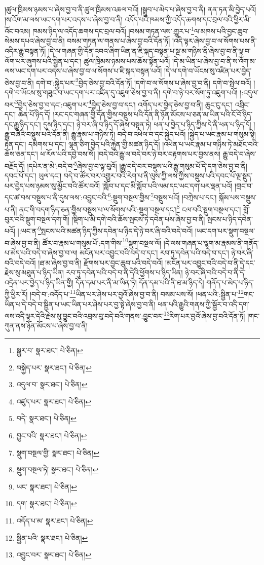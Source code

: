 །ཚུལ་ཁྲིམས་ཉམས་པ་ཞེས་བྱ་བ་ནི་ཚུལ་ཁྲིམས་འཆལ་བའོ། །སྒྲུབ་པ་མེད་པ་ཞེས་བྱ་བ་ནི། ནན་ཏན་མི་བྱེད་པའོ། །ས་འོག་མ་ལས་ཡང་དག་པར་འདས་པ་ཞེས་བྱ་བ་ནི། འདོད་པའི་ཁམས་ཀྱི་འདོད་ཆགས་དང་བྲལ་བའི་ཕྱིར་མི་འོང་བའམ། ཁམས་ཉིད་ལ་འདོད་ཆགས་དང་བྲལ་བའོ། །བསམ་གཏན་ལས་:གྱུར་པ་\footnote{སྒྱུར་བ་  སྣར་ཐང་།  པེ་ཅིན། }ལ་མཁས་པའི་བྱང་ཆུབ་སེམས་དཔའ་ཞེས་བྱ་བ་ནི། བསམ་གཏན་ལ་གནས་པ་ཞེས་བྱ་བའི་དོན་ཏོ། །འདི་ལྟར་ཞེས་བྱ་བ་ལ་སོགས་པས་ནི་འདིར་རྒྱུ་བསྟན་ཏོ། །དེ་ལ་གཞན་གྱི་དོན་འབའ་ཞིག་ཡིན་ན་ཇི་སྐད་བསྟན་པ་སྔ་མ་གཉིས་ནི་ཞེས་བྱ་བ་ནི་ལྟ་བ་ལོག་པར་ཞུགས་པའི་སྦྱིན་པ་དང་། ཚུལ་ཁྲིམས་ཉམས་པས་ཆོས་སྟོན་པའོ། །དེ་མ་ཡིན་པ་ཞེས་བྱ་བ་ནི་ས་འོག་མ་ལས་ཡང་དག་པར་འདས་པ་ཞེས་བྱ་བ་ལ་སོགས་པ་ཇི་སྐད་བསྟན་པའོ། །དེ་ལ་དགེ་བ་ཡོངས་སུ་འཛིན་པར་བྱེད་ཅེས་བྱ་བ་ནི། དགེ་བ་:སྐྱེད་པར་\footnote{བསྐྱེད་པར་  སྣར་ཐང་།  པེ་ཅིན། }བྱེད་ཅེས་བྱ་བའི་དོན་ཏོ། །དགེ་བ་ལ་སོགས་པ་ཞེས་བྱ་བ་ནི། དགེ་བ་སྤེལ་བའོ། །དགེ་བ་ཡོངས་སུ་གཟུང་བ་ཡང་དག་པར་འཛིན་དུ་འཇུག་ཅེས་བྱ་བ་ནི། དགེ་བ་ཉེ་བར་སོག་ཏུ་འཇུག་པའོ། །:འདུལ་བར་\footnote{འདུལ་བ་  སྣར་ཐང་།  པེ་ཅིན། }བྱེད་ཅེས་བྱ་བ་དང་:འཇུག་པར་\footnote{འཛུད་པར་  སྣར་ཐང་།  པེ་ཅིན། }བྱེད་ཅེས་བྱ་བ་དང་། འགོད་པར་བྱེད་ཅེས་བྱ་བ་ནི། ཆུང་ངུ་དང་། འབྲིང་དང་། ཆེན་པོ་ཉིད་དོ། །རང་དང་གཞན་གྱི་དོན་གྱིས་བསྡུས་པའི་དོན་ནི་ཉོན་མོངས་པ་ཅན་མ་ཡིན་པའི་ངོ་བོ་ཉིད་དང་རྒྱུ་ཉིད་དང་། དུས་ཉིད་དང་། ཉེ་བར་ཞི་བ་ཉིད་དོ་ཞེས་བསྟན་ཏེ། ཕན་པ་བྱེད་པ་ཉིད་ཀྱིས་དེ་ནི་ཕན་པ་ཉིད་དོ། །རྒྱུ་བཞིའི་བསྡུས་པའི་དོན་ནི། རྒྱུ་རྣམ་པ་གཉིས་ཏེ། བདེ་བ་འཕེལ་བ་དང་སྐྱེད་པའོ། །སྐྱེད་པ་ཡང་རྣམ་པ་གསུམ་སྟེ། རྟེན་དང་། དམིགས་པ་དང་། ལྷན་ཅིག་བྱེད་པའི་རྐྱེན་གྱི་མཚན་ཉིད་དོ། །འཕེན་པ་ཡང་རྣམ་པ་གཉིས་ཏེ་མཐོང་བའི་ཆོས་ཅན་དང་། ཕ་རོལ་པའི་དབྱེ་བས་སོ། །བདེ་བའི་རྒྱུ་ལ་བདེ་བར་ཉེ་བར་བརྟགས་པར་བྱས་ནས། རྒྱུ་བདེ་བ་ཞེས་བརྗོད་དོ། །དཔེར་ན་མེ་:བདེ་བ་\footnote{བདེ་  སྣར་ཐང་།  པེ་ཅིན། }ཞེས་བྱ་བ་ལྟ་བུའོ། །རྒྱུ་བདེ་བར་བསྡུས་པའི་རྒྱུ་གསུམ་པོ་དེ་དག་ཅེས་བྱ་བ་ནི། དབང་པོ་དང་། ཡུལ་དང་། བདེ་བ་ཚོར་བར་འགྱུར་བའི་རེག་པ་ནི་ལུས་ཀྱི་ལས་ཀྱིས་བསྡུས་པའི་དབང་པོ་ལྔ་སྡུད་པར་བྱེད་པས་ཉམས་སུ་མྱོང་བའི་ཚོར་བའོ། །སློབ་པ་དང་མི་སློབ་པའི་ལམ་དང་ཡང་དག་པར་ལྡན་པའོ། །གྲང་བ་དང་ཚ་བས་བསྡུས་པ་ནི་དུས་ལས་:འབྱུང་བའི་\footnote{བྱུང་བའི་  སྣར་ཐང་།  པེ་ཅིན། }:སྡུག་བསྔལ་གྱིས་\footnote{སྡུག་བསྔལ་གྱི་  སྣར་ཐང་།  པེ་ཅིན། }བསྡུས་པའོ། །བཀྲེས་པ་དང་། སྐོམ་པས་བསྡུས་པ་ནི། ནང་གི་བདག་ཉིད་ཅན་གྱིས་བསྡུས་པ་ལ་སོགས་པའི་:སྡུག་བསྔལ་དང་།\footnote{སྡུག་བསྔལ་ཏེ།  སྣར་ཐང་།  པེ་ཅིན། } ངལ་བའི་སྡུག་བསྔལ་དང་། གློ་བུར་བའི་སྡུག་བསྔལ་དག་གོ། །སྡིག་པ་མི་དགེ་བའི་ཆོས་སྤངས་ཏེ་དབེན་པས་ཞེས་བྱ་བ་ནི། སྤངས་པ་ཉིད་དབེན་པའོ། །:ཡང་ན་\footnote{ཡང་  སྣར་ཐང་།  པེ་ཅིན། }སྤངས་པའི་མཚན་ཉིད་ཀྱིས་དབེན་པ་ཉིད་དེ་ཉེ་བར་ཞི་བའི་བདེ་བའོ། །ཡང་དག་པར་སྡུག་བསྔལ་བ་ཞེས་བྱ་བ་ནི། ཚོར་བ་རྣམ་པ་གསུམ་པོ་:དག་གིས་\footnote{དག་  སྣར་ཐང་།  པེ་ཅིན། }སྡུག་བསྔལ་ལོ། །དེ་ལས་གཞན་པ་ལྷག་མ་རྣམས་ནི་གནོད་པ་མེད་པའི་བདེ་བ་ཞེས་བྱ་བ་ལ། མངོན་པར་འབྱུང་བའི་བདེ་བ་དང་། རབ་ཏུ་དབེན་པའི་བདེ་བ་དང་། ཉེ་བར་ཞི་བའི་བདེ་བའོ། །ཐ་མ་ཞེས་བྱ་བ་ནི། རྫོགས་པར་བྱང་ཆུབ་པའི་བདེ་བའོ། །མངོན་པར་འབྱུང་བའི་བདེ་བ་ནི་དེ་དང་རྗེས་སུ་མཐུན་པ་ཉིད་ཡིན། རབ་ཏུ་དབེན་པའི་བདེ་བ་ནི་དེའི་ཕྱོགས་པ་ཉིད་ཡིན། ཉེ་བར་ཞི་བའི་བདེ་བ་ནི་དེ་འདྲེན་པར་བྱེད་པ་ཉིད་ཡིན་གྱི། དོན་དམ་པར་ནི་མ་ཡིན་ཏེ། དོན་དམ་པའི་ནི་ཐ་མ་ཉིད་དེ། གནོད་པ་མེད་པ་ཉིད་ཀྱི་ཕྱིར་རོ། །བདེ་བ་:འདོད་པ་\footnote{འདོད་པ་མ་  སྣར་ཐང་།  པེ་ཅིན། }ཡིན་པར་ཤེས་པར་བྱའོ་ཞེས་བྱ་བ་ནི། བསམ་པས་སོ། །ཕན་པའི་:སྦྱིན་པ་\footnote{སྦྱིན་པའི་  སྣར་ཐང་།  པེ་ཅིན། }གང་ཡིན་པ་དེ་བདེ་བ་སྦྱིན་པ་ཡང་ཡིན་པར་ཤེས་པར་བྱ་སྟེ་ཞེས་བྱ་བ་ནི། ཕན་པའི་རྒྱུའི་གནས་ཀྱི་སྦྱོར་བ་འདི་དག་ལས་འདི་ལྟར་དེའི་རྗེས་སུ་བྱུང་བའི་འབྲས་བུ་བདེ་བའི་གནས་:བྱུང་བར་\footnote{འབྱུང་བར་  སྣར་ཐང་།  པེ་ཅིན། }རིག་པར་བྱའོ་ཞེས་བྱ་བའི་དོན་ཏོ། །གང་ཀུན་ནས་ཉོན་མོངས་པ་ཞེས་བྱ་བ་ནི། 